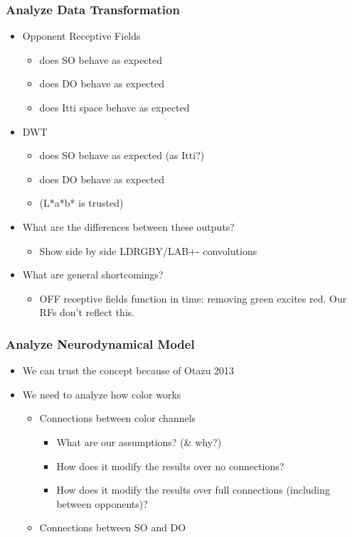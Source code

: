 \documentclass[journal,onecolumn]{IEEEtran}
\begin{document}
\subsubsection{Analyze Data Transformation}
\begin{itemize}
    \item Opponent Receptive Fields
    \begin{itemize}
        \item does SO behave as expected
        \item does DO behave as expected
        \item does Itti space behave as expected
    \end{itemize}
    \item DWT
    \begin{itemize}
        \item does SO behave as expected (as Itti?)
        \item does DO behave as expected
        \item (L*a*b* is trusted)
    \end{itemize}
    \item What are the differences between these outputs?
    \begin{itemize}
        \item Show side by side LDRGBY/LAB+- convolutions
    \end{itemize}
    \item What are general shortcomings?
    \begin{itemize}
        \item OFF receptive fields function in time: removing green excites red. Our RFs don't reflect this.
    \end{itemize}
\end{itemize}

\subsubsection{Analyze Neurodynamical Model}
\begin{itemize}
    \item We can trust the concept because of Otazu 2013
    \item We need to analyze how color works
    \begin{itemize}
        \item Connections between color channels
        \begin{itemize}
            \item What are our assumptions? (\& why?)
            \item How does it modify the results over no connections?
            \item How does it modify the results over full connections (including between opponents)?
        \end{itemize}
        \item Connections between SO and DO
    \end{itemize}
\end{itemize}
\end{document}
